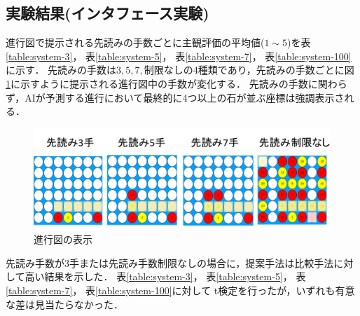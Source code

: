\subsection{実験結果(インタフェース実験)}
進行図で提示される先読みの手数ごとに主観評価の平均値($1\sim5$)を表\ref{table:system-3}， 表\ref{table:system-5}， 表\ref{table:system-7}， 表\ref{table:system-100}に示す．
先読みの手数は${3, 5, 7, \textrm{制限なし}}$の4種類であり，先読みの手数ごとに図\ref{fig:see}に示すように提示される進行図中の手数が変化する．
先読みの手数に関わらず，AIが予測する進行において最終的に4つ以上の石が並ぶ座標は強調表示される．
\begin{figure}[htbp]
    \centering
    \includegraphics[width=\linewidth]{./figure/see.png}
	\caption{進行図の表示}
	\label{fig:see}
\end{figure}
先読み手数が3手または先読み手数制限なしの場合に，提案手法は比較手法に対して高い結果を示した．
表\ref{table:system-3}， 表\ref{table:system-5}， 表\ref{table:system-7}， 表\ref{table:system-100}に対して
t検定を行ったが，いずれも有意な差は見当たらなかった．
\begin{table}[H]
    \caption{先読み手数３手の場合(インタフェース実験)}
    \label{table:system-3}
    \scriptsize
    \centering
    
\end{table}
